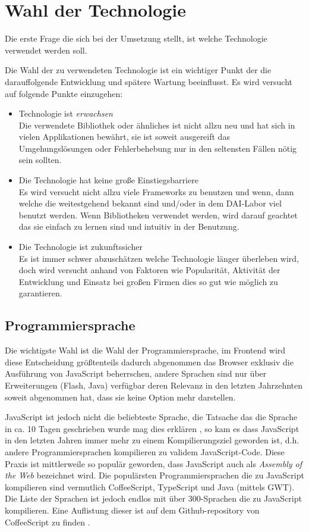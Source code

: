 \documentclass[12pt,twoside]{book}
\begin{document}
\section{Wahl der Technologie}

Die erste Frage die sich bei der Umsetzung stellt, ist welche Technologie verwendet werden soll.

Die Wahl der zu verwendeten Technologie ist ein wichtiger Punkt der die darauffolgende Entwicklung und spätere Wartung beeinflusst. Es wird versucht auf folgende Punkte einzugehen:

\begin{itemize}
  \item Technologie ist \textit{erwachsen} \\
  Die verwendete Bibliothek oder ähnliches ist nicht allzu neu und hat sich in vielen Applikationen bewährt, sie ist soweit ausgereift das Umgehungslösungen oder Fehlerbehebung nur in den seltensten Fällen nötig sein sollten.
  \item Die Technologie hat keine große Einstiegsbarriere \\
  Es wird versucht nicht allzu viele Frameworks zu benutzen und wenn, dann welche die weitestgehend bekannt sind und/oder in dem DAI-Labor viel benutzt werden. Wenn Bibliotheken verwendet werden, wird darauf geachtet das sie einfach zu lernen sind und intuitiv in der Benutzung.
  \item Die Technologie ist zukunftssicher \\
  Es ist immer schwer abzuschätzen welche Technologie länger überleben wird, doch wird versucht anhand von Faktoren wie Popularität, Aktivität der Entwicklung und Einsatz bei großen Firmen dies so gut wie möglich zu garantieren.
\end{itemize}

\subsection{Programmiersprache}

Die wichtigste Wahl ist die Wahl der Programmiersprache, im Frontend wird diese Entscheidung größtenteils dadurch abgenommen das Browser exklusiv die Ausführung von JavaScript beherrschen, andere Sprachen sind nur über Erweiterungen (Flash, Java) verfügbar deren Relevanz in den letzten Jahrzehnten soweit abgenommen hat, dass sie keine Option mehr darstellen.

JavaScript ist jedoch nicht die beliebteste Sprache, die Tatsache das die Sprache in ca. 10 Tagen geschrieben wurde mag dies erklären \citep{severance2012javascript}, so kam es dass JavaScript in den letzten Jahren immer mehr zu einem Kompilierungsziel geworden ist, d.h. andere Programmiersprachen kompilieren zu validem JavaScript-Code. Diese Praxis ist mittlerweile so populär geworden, dass JavaScript auch als \textit{Assembly of the Web} \cite{webassembly} bezeichnet wird. Die populärsten Programmiersprachen die zu JavaScript kompilieren sind vermutlich CoffeeScript, TypeScript und Java (mittels GWT). Die Liste der Sprachen ist jedoch endlos mit über 300-Sprachen die zu JavaScript kompilieren. Eine Auflistung dieser ist auf dem Github-repository von CoffeeScript zu finden \cite{javascriptcompile}.
\end{document}
